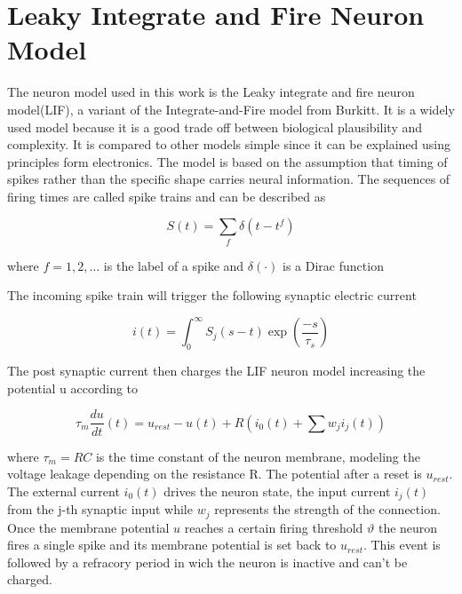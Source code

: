 \section{Leaky Integrate and Fire Neuron Model}
The neuron model used in this work is the Leaky integrate and fire neuron model(LIF)\cite{(Stein, 1965)}, a variant of the Integrate-and-Fire model from Burkitt\cite{(Burkitt, 2006)}. It is a widely used model because it is a good trade off between biological plausibility and complexity. It is compared to other models simple since it can be explained using principles form electronics. The model is based on the assumption that timing of spikes rather than the specific shape carries neural information. The sequences of firing times are called spike trains and can be described as

\begin{equation}\label{eq:spikeTrain}
S\left(t\right) = \sum_{f}\delta\left(t - t^f\right)
\end{equation}

where $ f = 1, 2, \dots $ is the label of a spike and $\delta\left(\cdot\right) $ is a Dirac function %

The incoming spike train will trigger the following synaptic electric current

\begin{equation}\label{eq:current}
i\left(t\right) = \int_{0}^{\infty} S_j\left(s - t\right)\exp\left(\frac{-s}{\tau_s}\right)
\end{equation}

The post synaptic current then charges the LIF neuron model increasing the potential u according to

\begin{equation}\label{eq:potential}
\tau_m\frac{du}{dt}\left(t\right)=u_{rest} - u\left(t\right) + R\left(i_0\left(t\right) + \sum w_ji_j\left(t\right) \right)
\end{equation}

where $\tau_m=RC$ is the time constant of the neuron membrane, modeling the voltage leakage depending on the resistance R. The potential after a reset is $u_{rest}$. The external current $i_0\left(t\right)$ drives the neuron state, the input current $i_j\left(t\right)$ from the j-th synaptic input while $w_j$ represents the strength of the connection. Once the membrane potential $u$ reaches a certain firing threshold $\vartheta$ the neuron fires a single spike and its membrane potential is set back to $u_{rest}$. This event is followed by a refracory period in wich the neuron is inactive and can't be charged.

